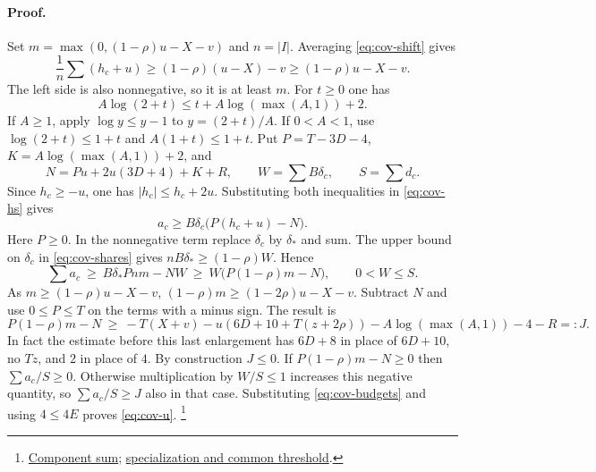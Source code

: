 \paragraph{Proof.}
Set \(m=\max(0,(1-\rho)u-X-v)\) and \(n=|I|\). Averaging
\eqref{eq:cov-shift} gives
\[
 \frac1n\sum(h_c+u)\ge (1-\rho)(u-X)-v
 \ge (1-\rho)u-X-v.
\]
The left side is also nonnegative, so it is at least \(m\).
For \(t\ge0\) one has
\[
 A\log(2+t)\le t+A\log(\max(A,1))+2 .
\]
If \(A\ge1\), apply \(\log y\le y-1\) to \(y=(2+t)/A\). If
\(0<A<1\), use \(\log(2+t)\le1+t\) and \(A(1+t)\le1+t\).
Put \(P=T-3D-4\), \(K=A\log(\max(A,1))+2\), and
\[
 N=Pu+2u(3D+4)+K+R,\qquad W=\sum B\delta_c,\qquad S=\sum d_c.
\]
Since \(h_c\ge-u\), one has \(|h_c|\le h_c+2u\). Substituting both
inequalities in \eqref{eq:cov-hs} gives
\[
 a_c\ge B\delta_c\bigl(P(h_c+u)-N\bigr).
\]
Here \(P\ge0\). In the nonnegative term replace \(\delta_c\) by
\(\delta_*\) and sum. The upper bound on \(\delta_c\) in
\eqref{eq:cov-shares} gives \(nB\delta_*\ge(1-\rho)W\). Hence
\[
 \sum a_c\ \ge\ B\delta_* Pnm-NW
       \ \ge\ W\bigl(P(1-\rho)m-N\bigr),\qquad 0<W\le S .
\]
As \(m\ge(1-\rho)u-X-v\),
\((1-\rho)m\ge(1-2\rho)u-X-v\). Subtract \(N\) and use
\(0\le P\le T\) on the terms with a minus sign. The result is
\[
 P(1-\rho)m-N\ \ge\ -T(X+v)-u(6D+10+T(z+2\rho))
              -A\log(\max(A,1))-4-R=:J .
\]
In fact the estimate before this last enlargement has \(6D+8\) in
place of \(6D+10\), no \(Tz\), and \(2\) in place of \(4\).
By construction \(J\le0\). If \(P(1-\rho)m-N\ge0\) then
\(\sum a_c/S\ge0\). Otherwise multiplication by \(W/S\le1\)
increases this negative quantity, so \(\sum a_c/S\ge J\) also in
that case. Substituting \eqref{eq:cov-budgets} and using \(4\le4E\)
proves \eqref{eq:cov-u}.
\footnote{\href{https://github.com/Deicyde/riemann-hypothesis/blob/40e56bab/src/Formalism/MeanHeightDescent/AverageDegreeBounds/SumComponents.lean}{Component sum};
\href{https://github.com/Deicyde/riemann-hypothesis/blob/40e56bab/src/Development/AbelianVarietyTheory/Proofs/DivisorProofs/UniformLowerBoundOfSums.lean}{specialization and common threshold}.}

